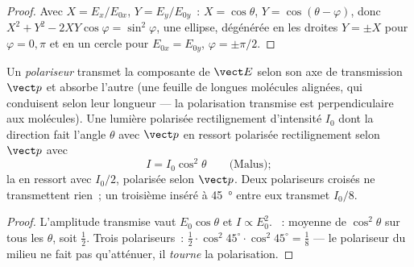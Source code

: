 \begin{proof}
Avec $X = E_x/E_{0x}$, $Y = E_y/E_{0y}$~: $X = \cos\theta$, $Y = \cos(\theta - \varphi)$, donc
$X^2 + Y^2 - 2XY\cos\varphi = \sin^2\varphi$, une ellipse, dégénérée en les
droites $Y = \pm X$ pour $\varphi = 0, \pi$ et en un cercle pour $E_{0x} = E_{0y}$,
$\varphi = \pm\pi/2$.
\end{proof}

\begin{proposition}\label{prop:b2:plane-waves-polarization:malus}
Un \emph{polariseur} transmet la composante de $\vect E$ selon son
axe de transmission $\vect p$ et absorbe l'autre (une feuille de longues
molécules alignées, qui conduisent selon leur longueur --- la polarisation
transmise est perpendiculaire aux molécules). Une lumière polarisée rectilignement
d'intensité $I_0$ dont la direction fait l'angle $\theta$ avec
$\vect p$ en ressort polarisée rectilignement selon $\vect p$ avec
\[
I = I_0\cos^2\theta \qquad\text{(Malus)} ;
\]
la  en ressort avec $I_0/2$, polarisée selon $\vect p$. Deux
polariseurs croisés ne transmettent rien~; un troisième inséré à
\qty{45}{\degree} entre eux transmet $I_0/8$.
\end{proposition}

\begin{proof}
L'amplitude transmise vaut $E_0\cos\theta$ et $I \propto E_0^2$. ~:
moyenne de $\cos^2\theta$ sur tous les $\theta$, soit $\tfrac12$. Trois polariseurs~:
$\tfrac12\cdot\cos^2 45^\circ\cdot\cos^2 45^\circ = \tfrac18$ --- le polariseur
du milieu ne fait pas qu'atténuer, il \emph{tourne} la polarisation.
\end{proof}

